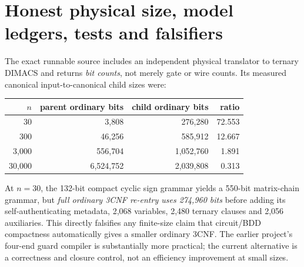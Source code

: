 \documentclass[11pt]{article}
\begin{document}
\section{Honest physical size, model ledgers, tests and falsifiers}
The exact runnable source includes an independent physical translator to ternary DIMACS and returns \emph{bit counts}, not merely gate or wire counts. Its measured canonical input-to-canonical child sizes were:
\begin{center}\begin{tabular}{r r r r}\toprule
$n$ & parent ordinary bits & child ordinary bits & ratio \\\midrule
30&3,808&276,280&72.553\\
300&46,256&585,912&12.667\\
3,000&556,704&1,052,760&1.891\\
30,000&6,524,752&2,039,808&0.313\\
\bottomrule\end{tabular}\end{center}
At $n=30$, the 132-bit compact cyclic sign grammar yields a 550-bit matrix-chain grammar, but \emph{full ordinary 3CNF re-entry uses 274,960 bits} before adding its self-authenticating metadata, 2,068 variables, 2,480 ternary clauses and 2,056 auxiliaries. This directly falsifies any finite-size claim that circuit/BDD compactness automatically gives a smaller ordinary 3CNF. The earlier project's four-end guard compiler is substantially more practical; the current alternative is a correctness and closure control, not an efficiency improvement at small sizes.
\end{document}
